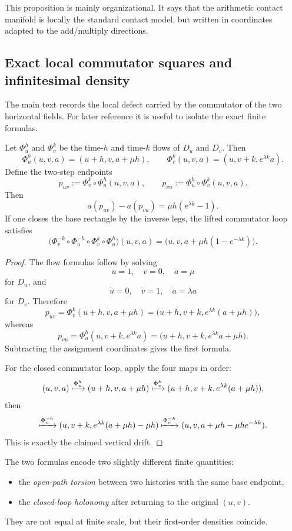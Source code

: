 This proposition is mainly organizational. It says that the arithmetic contact manifold is locally the standard contact model, but written in coordinates adapted to the add/multiply directions.

\subsection{Exact local commutator squares and infinitesimal density}
\label{appD:commutator-squares}

The main text records the local defect carried by the commutator of the two horizontal fields. For later reference it is useful to isolate the exact finite formulas.

\begin{proposition}
\label{prop:appD-commutator-square}
Let $\Phi_u^h$ and $\Phi_v^k$ be the time-$h$ and time-$k$ flows of $D_u$ and $D_v$. Then
\[
\Phi_u^h(u,v,a)=(u+h,v,a+\mu h),
\qquad
\Phi_v^k(u,v,a)=(u,v+k,e^{\lambda k}a).
\]
Define the two-step endpoints
\[
p_{uv}:=\Phi_v^k\!\circ\Phi_u^h(u,v,a),
\qquad
p_{vu}:=\Phi_u^h\!\circ\Phi_v^k(u,v,a).
\]
Then
\[
a(p_{uv})-a(p_{vu})=\mu h(e^{\lambda k}-1).
\]
If one closes the base rectangle by the inverse legs, the lifted commutator loop satisfies
\[
\bigl(\Phi_v^{-k}\circ\Phi_u^{-h}\circ\Phi_v^k\circ\Phi_u^h\bigr)(u,v,a)
=\bigl(u,v,a+\mu h(1-e^{-\lambda k})\bigr).
\]
\end{proposition}

\begin{proof}
The flow formulas follow by solving
\[
\dot u=1,\quad \dot v=0,\quad \dot a=\mu
\]
for $D_u$, and
\[
\dot u=0,\quad \dot v=1,\quad \dot a=\lambda a
\]
for $D_v$.
Therefore
\[
p_{uv}
=\Phi_v^k(u+h,v,a+\mu h)
=\bigl(u+h,v+k,e^{\lambda k}(a+\mu h)\bigr),
\]
whereas
\[
p_{vu}
=\Phi_u^h(u,v+k,e^{\lambda k}a)
=\bigl(u+h,v+k,e^{\lambda k}a+\mu h\bigr).
\]
Subtracting the assignment coordinates gives the first formula.

For the closed commutator loop, apply the four maps in order:
\[
(u,v,a)
\xmapsto{\Phi_u^h}(u+h,v,a+\mu h)
\xmapsto{\Phi_v^k}(u+h,v+k,e^{\lambda k}(a+\mu h)),
\]
then
\[
\xmapsto{\Phi_u^{-h}}(u,v+k,e^{\lambda k}(a+\mu h)-\mu h)
\xmapsto{\Phi_v^{-k}}(u,v,a+\mu h-\mu he^{-\lambda k}).
\]
This is exactly the claimed vertical drift.
\end{proof}

The two formulas encode two slightly different finite quantities:
\begin{itemize}
    \item the \emph{open-path torsion} between two histories with the same base endpoint,
    \item the \emph{closed-loop holonomy} after returning to the original $(u,v)$.
\end{itemize}
They are not equal at finite scale, but their first-order densities coincide.

